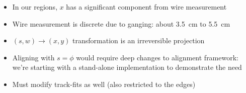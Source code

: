 \documentclass[compress]{beamer}
\begin{document}
\begin{frame}
\begin{columns}
\begin{itemize}
\item In our regions, $x$ has a significant component from wire measurement
\item Wire measurement is discrete due to ganging: about 3.5~cm to 5.5~cm
\item $(s,w) \to (x,y)$ transformation is an irreversible projection
\item Aligning with $s = \phi$ would require deep changes to alignment framework: we're starting with a stand-alone implementation to demonstrate the need
\item Must modify track-fits as well (also restricted to the edges)
\end{itemize}
\end{columns}
\end{frame}
\end{document}
